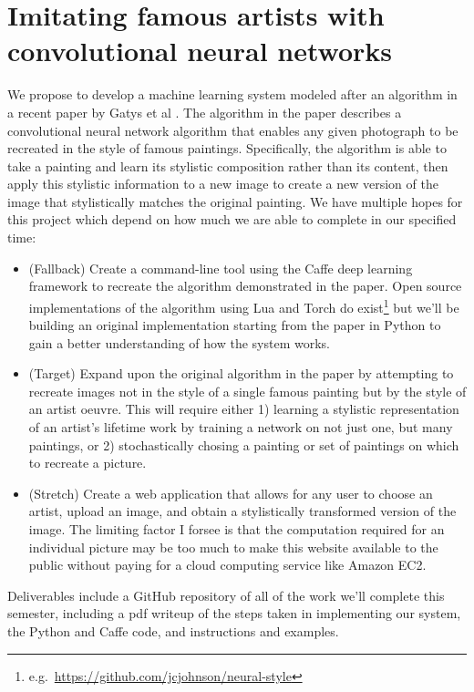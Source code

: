 \documentclass[letterpaper,10pt]{article}
\begin{document}
\section*{Imitating famous artists with convolutional neural networks}

We propose to develop a machine learning system modeled after an algorithm in a
recent paper by Gatys et al \cite{gatys15}. The algorithm in the paper
describes a convolutional neural network algorithm that enables any given
photograph to be recreated in the style of famous paintings. Specifically, the
algorithm is able to take a painting and learn its stylistic composition rather
than its content, then apply this stylistic information to a new image to
create a new version of the image that stylistically matches the original
painting. We have multiple hopes for this project which depend on how much we
are able to complete in our specified time:

\begin{itemize}
  \item (Fallback) Create a command-line tool using the Caffe \cite{jia14} deep learning
    framework to recreate the algorithm demonstrated in the paper. Open source
    implementations of the algorithm using Lua and Torch do
    exist\footnote{e.g.\ \href{https://github.com/jcjohnson/neural-style}{https://github.com/jcjohnson/neural-style}}
    but we'll be building an original implementation starting from the paper
    in Python to gain a better understanding of how the system works.
  \item (Target) Expand upon the original algorithm in the paper by attempting
    to recreate images not in the style of a single famous painting but by the
    style of an artist oeuvre. This will require either 1) learning a stylistic
    representation of an artist's lifetime work by training a network on not
    just one, but many paintings, or 2) stochastically chosing a painting or
    set of paintings on which to recreate a picture.
  \item (Stretch) Create a web application that allows for any user to choose
    an artist, upload an image, and obtain a stylistically transformed version
    of the image. The limiting factor I forsee is that the computation required
    for an individual picture may be too much to make this website available to
    the public without paying for a cloud computing service like Amazon EC2.
\end{itemize}

Deliverables include a GitHub repository of all of the work we'll complete this
semester, including a pdf writeup of the steps taken in implementing our system, the Python and Caffe code, and instructions and examples.
\end{document}

